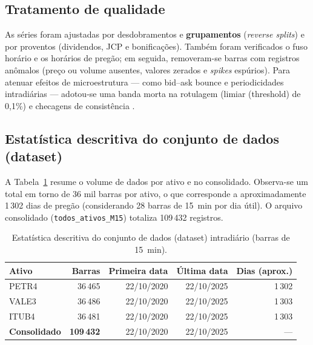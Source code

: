 \subsection{Tratamento de qualidade}
As séries foram ajustadas por desdobramentos e \textbf{grupamentos} (\emph{reverse splits}) e por proventos (dividendos, JCP e bonificações). Também foram verificados o fuso horário e os horários de pregão; em seguida, removeram-se barras com registros anômalos (preço ou volume ausentes, valores zerados e \emph{spikes} espúrios). Para atenuar efeitos de microestrutura --- como bid--ask bounce e periodicidades intradiárias --- adotou-se uma banda morta na rotulagem (limiar (threshold) de 0,1\%) e checagens de consistência \cite{hasbrouck2007empirical,andersen1997intraday}.

\subsection{Estatística descritiva do conjunto de dados (dataset)}
A Tabela~\ref{tab:estatistica-dados} resume o volume de dados por ativo e no consolidado. Observa-se um total em torno de 36 mil barras por ativo, o que corresponde a aproximadamente 1\,302 dias de pregão (considerando 28 barras de 15~min por dia útil). O arquivo consolidado (\texttt{todos\_ativos\_M15}) totaliza 109\,432 registros.

\begin{table}[htbp]
  \centering
  \caption{Estatística descritiva do conjunto de dados (dataset) intradiário (barras de 15~min).}
  \label{tab:estatistica-dados}
  \begin{tabular}{lrrrr}
    \toprule
    \textbf{Ativo} & \textbf{Barras} & \textbf{Primeira data} & \textbf{Última data} & \textbf{Dias (aprox.)} \\
    \midrule
    PETR4 & 36\,465 & 22/10/2020 & 22/10/2025 & 1\,302 \\
    VALE3 & 36\,486 & 22/10/2020 & 22/10/2025 & 1\,303 \\
    ITUB4 & 36\,481 & 22/10/2020 & 22/10/2025 & 1\,303 \\
    \midrule
    \textbf{Consolidado} & \textbf{109\,432} & 22/10/2020 & 22/10/2025 & --- \\
    \bottomrule
  \end{tabular}
\end{table}

